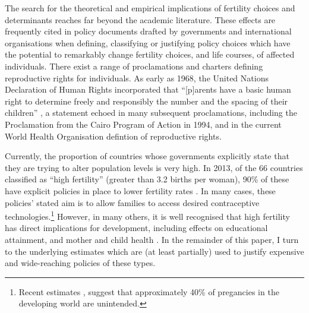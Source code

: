\documentclass{article}
\begin{document}
\begin{spacing}{1.4}
The search for the theoretical and empirical implications of fertility choices
and determinants reaches far beyond the academic literature. These effects are
frequently cited in policy documents drafted by governments and international 
organisations when defining, classifying or justifying policy choices which have
the potential to remarkably change fertility choices, and life courses, of 
affected individuals. There exist a range of proclamations and charters defining 
reproductive rights for individuals.  As early as 1968, the United Nations 
Declaration of Human Rights incorporated that ``[p]arents have a basic human 
right to determine freely and responsibly the number and the spacing of their 
children'' \citep{UN1968}, a statement echoed in many subsequent proclamations, 
including the Proclamation from the Cairo Program of Action in 1994, and in the 
current World Health Organisation defintion of reproductive rights. 

Currently, the proportion of countries whose governments explicitly state that
they are trying to alter population levels is very high.  In 2013, of the 66 
countries classified as ``high fertility'' (greater than 3.2 births per woman), 
90\% of these have explicit policies in place to lower fertility rates 
\citep{UN2013}.  In many cases, these policies' stated aim is to allow families
to access desired contraceptive technologies.\footnote{Recent estimates 
  \citep{BongaartsSinding2011}, suggest that approximately 40\% of pregancies in
  the developing world are unintended.}  However, in many others, it is well
recognised that high fertility has direct implications for development,
including effects on educational attainment, and mother and child health
\citep{UN2013}.  In the remainder of this paper, I turn to the underlying
estimates which are (at least partially) used to justify expensive and
wide-reaching policies of these types.


\end{spacing}
\end{document}
